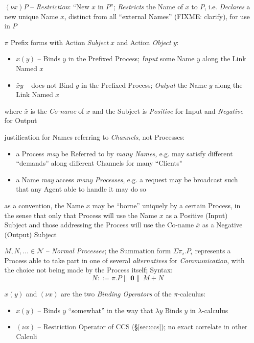 $(\nu{x})P$ -- \emph{Restriction}: ``New $x$ in $P$''; \emph{Restricts} the Name
of $x$ to $P$, i.e. \emph{Declares} a new unique Name $x$, distinct from all
``external Names'' (FIXME: clarify), for use in $P$

$\pi$ Prefix forms with Action \emph{Subject} $x$ and Action \emph{Object} $y$:
\begin{itemize}
  \item $x(y)$ -- Binds $y$ in the Prefixed Process; \emph{Input} some Name $y$
    along the Link Named $x$
  \item $\bar{x}y$ -- does not Bind $y$ in the Prefixed Process; \emph{Output}
    the Name $y$ along the Link Named $x$
\end{itemize}
where $\bar{x}$ is the \emph{Co-name} of $x$ and the Subject is \emph{Positive}
for Input and \emph{Negative} for Output

justification for Names referring to \emph{Channels}, not Processes:
\begin{itemize}
  \item a Process \emph{may} be Referred to by \emph{many Names}, e.g. may
    satisfy different ``demands'' along different Channels for many ``Clients''
  \item a Name \emph{may} access \emph{many Processes}, e.g. a request may be
    broadcast such that any Agent able to handle it may do so
\end{itemize}

as a convention, the Name $x$ may be ``borne'' uniquely by a certain Process, in
the sense that only that Process will use the Name $x$ as a Positive (Input)
Subject and those addressing the Process will use the Co-name $\bar{x}$ as a
Negative (Output) Subject

$M,N,\ldots \in \mathcal{N}$ -- \emph{Normal Processes}; the Summation form
$\Sigma\pi_i.P_i$ represents a Process able to take part in one of several
\emph{alternatives} for \emph{Communication}, with the choice not being made by
the Process itself; Syntax:
\[
  N ::= \pi.P \|\ \mathbf{0} \|\ M + N
\]

$x(y)$ and $(\nu{x})$ are the two \emph{Binding Operators} of the
$\pi$-calculus:
\begin{itemize}
  \item $x(y)$ -- Binds $y$ ``somewhat'' in the way that $\lambda{y}$ Binds $y$
    in $\lambda$-calculus
  \item $(\nu{x})$ -- Restriction Operator of CCS (\S\ref{sec:ccs}); no exact
    correlate in other Calculi
\end{itemize}

